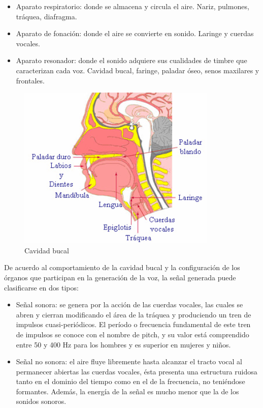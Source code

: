 \begin{itemize}
\item	Aparato respiratorio: donde se almacena y circula el aire. Nariz, pulmones, tráquea, diafragma.
\item	Aparato de fonación: donde el aire se convierte en sonido. Laringe y cuerdas vocales.
\item	Aparato resonador: donde el sonido adquiere sus cualidades de timbre que caracterizan cada voz. Cavidad bucal, faringe, paladar óseo, senos maxilares y frontales.
\end{itemize}

\begin{figure}[H]
	\centering
	\includegraphics[width=0.6\linewidth]{figures/cavidadBucal}
	\caption{Cavidad bucal}
	\label{fig:cavidadBucal}
\end{figure}

De acuerdo al comportamiento de la cavidad bucal y la configuración de los órganos que participan en la generación de la voz, la señal generada puede clasificarse en dos tipos:

\begin{itemize}
\item	Señal sonora: se genera por la acción de las cuerdas vocales, las cuales se abren y cierran modificando el área de la tráquea y produciendo un tren de impulsos cuasi-periódicos. El período o frecuencia fundamental de este tren de impulsos se conoce con el nombre de pitch, y su valor está comprendido entre 50 y 400 Hz para los hombres y es superior en mujeres y niños. \cite{Alonso1999}
\item	Señal no sonora: el aire fluye libremente hasta alcanzar el tracto vocal al permanecer abiertas las cuerdas vocales, ésta presenta una estructura ruidosa tanto en el dominio del tiempo como en el de la frecuencia, no teniéndose formantes. Además, la energía de la señal es mucho menor que la de los sonidos sonoros. \cite{Alonso1999}
\end{itemize}

